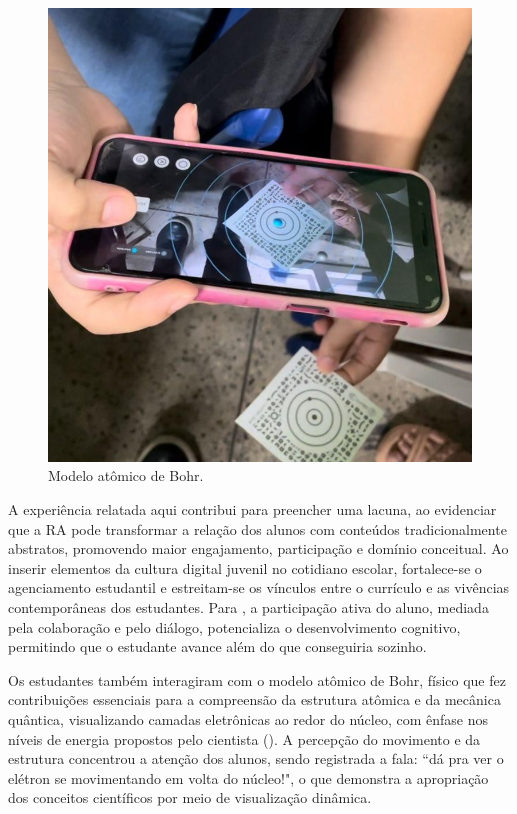 \documentclass[portuguese]{textolivre}
\begin{document}
\begin{figure}[htbp]
\centering
\begin{minipage}{0.55\textwidth}
\includegraphics[width =\textwidth]{Imagens/Fig4.jpg}
\caption{Modelo atômico de Bohr.}
\label{fig-4}
\end{minipage}
\end{figure}

A experiência relatada aqui contribui para preencher uma lacuna, ao evidenciar que a RA pode transformar a relação dos alunos com conteúdos tradicionalmente abstratos, promovendo maior engajamento, participação e domínio conceitual. Ao inserir elementos da cultura digital juvenil no cotidiano escolar, fortalece-se o agenciamento estudantil e estreitam-se os vínculos entre o currículo e as vivências contemporâneas dos estudantes. Para \textcite{vygotsky2000}, a participação ativa do aluno, mediada pela colaboração e pelo diálogo, potencializa o desenvolvimento cognitivo, permitindo que o estudante avance além do que conseguiria sozinho.

Os estudantes também interagiram com o modelo atômico de Bohr, físico que fez contribuições essenciais para a compreensão da estrutura atômica e da mecânica quântica, visualizando camadas eletrônicas ao redor do núcleo, com ênfase nos níveis de energia propostos pelo cientista (). A percepção do movimento e da estrutura concentrou a atenção dos alunos, sendo registrada a fala: ``dá pra ver o elétron se movimentando em volta do núcleo!", o que demonstra a apropriação dos conceitos científicos por meio de visualização dinâmica.
\end{document}
